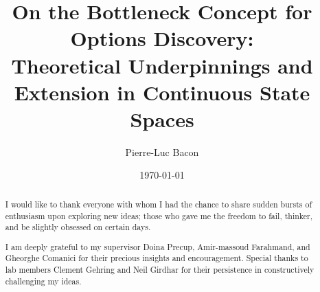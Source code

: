 \documentclass[12pt, oneside, extrafontsizes]{memoir}  %
\theoremstyle{plain}
\theoremstyle{definition}
\begin{document}

\pretitle{\begin{center}\cftchapterfont\huge}
\posttitle{\end{center}}
\preauthor{\begin{center}\huge}
\postauthor{\end{center}}
\predate{\begin{center}\large}
\postdate{\end{center}}

\title{On the Bottleneck Concept for Options Discovery: \\ \large{Theoretical Underpinnings and Extension in Continuous State Spaces} }
\author{Pierre-Luc Bacon}
\date{\today}
\renewcommand\maketitlehookb{
\vfill
}
\renewcommand\maketitlehookc{
\vfill
\begin{center}
{
\large
Computer Science\\
McGill University, Montreal
}
\end{center}
\vspace{10mm}
}
\renewcommand\maketitlehookd{
\vspace{10mm}
A thesis submitted to McGill University in partial fulfilment of the requirements of
the degree of Master of Science.
\copyright Pierre-Luc Bacon; \today.
}

\begin{titlingpage}
\maketitle
\end{titlingpage}


\clearpage
{}
\renewcommand{\abstractname}{Acknowledgements}
\begin{abstract}
I would like to thank everyone with whom I had the chance to share sudden bursts of 
enthusiasm upon exploring new ideas; those who gave me the freedom to fail, thinker,
and be slightly obsessed on certain days.

I am deeply grateful to my supervisor Doina Precup, Amir-massoud Farahmand, and Gheorghe Comanici for their precious insights and encouragement. Special thanks to lab members Clement Gehring and Neil Girdhar for their persistence in constructively challenging my ideas.
\end{abstract}
\end{document}
